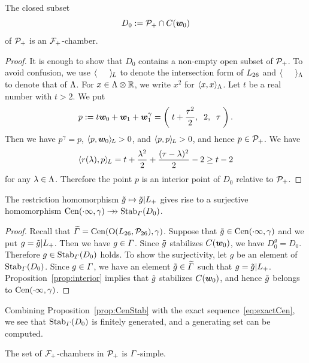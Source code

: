 \documentclass{amsart} %
\begin{document}
%
%
\begin{proposition}\label{prop:D0}
The closed subset 
\[
D_0:=\mathord{\mathcal{P}}_{+}\cap \mathord{C}(\boldsymbol{w}_0)
\]
of $\mathord{\mathcal{P}}_{+}$ is an $\mathord{\mathcal{F}}_{+}$-chamber.
\end{proposition}
%
\begin{proof}
It is enough to show that $D_0$ contains a non-empty open subset of $\mathord{\mathcal{P}}_{+}$.
To avoid confusion, we use $\langle \phantom{a, a} \rangle_{\hskip -1pt L}$ to denote the intersection form of $L_{26}$
and $\langle \phantom{a, a} \rangle_{\Lambda}$ to denote that of $\Lambda$.
For $x\in \Lambda\otimes\mathord{\mathbb{R}}$, we write $x^2$ for $\langle x,x \rangle_{\Lambda}$.
Let $t$ be a real number with $t>2$.
We put
\[
p:=t\boldsymbol{w}_0+\boldsymbol{w}_1+\boldsymbol{w}_1^{\gamma}=\left(\; t+\frac{\tau^2}{2}, \;\;2, \;\; \tau\;\right).
\]
%
Then we have $p^{\gamma}=p$, $\langle p, \boldsymbol{w}_0 \rangle_{\hskip -1pt L}>0$, and $\langle p, p \rangle_{\hskip -1pt L}>0$,
and hence $p\in \mathord{\mathcal{P}}_{+}$.
We have 
\[
\langle r(\lambda), p \rangle_{\hskip -1pt L}=t+\frac{\lambda^2}{2}+\frac{(\tau-\lambda)^2}{2}-2\ge t-2
\]
for any $\lambda\in \Lambda$.
Therefore the point $p$ is an interior point of $D_0$ relative to $\mathord{\mathcal{P}}_{+}$.
\end{proof}
%
\begin{proposition}\label{prop:CenStab}
The restriction homomorphism
$\tilde{g}\mapsto \tilde{g}|L_{+}$
gives rise to a surjective homomorphism 
$\mathrm{Cen}(\cdot \infty, \gamma)\mathrel{\rightarrow\!\!\!\!\rightarrow} \operatorname{Stab}_{\varGamma}(D_0)$.
\end{proposition}
%
\begin{proof}
Recall that 
$\widetilde{\varGamma}=\mathrm{Cen}(\mathord{\mathrm{O}}(L_{26}, \mathord{\mathcal{P}}_{26}), \gamma)$.
Suppose that $\tilde{g}\in \mathrm{Cen}(\cdot \infty, \gamma)$
and we put $g=\tilde{g}|L_{+}$.
Then we have $g\in \varGamma$.
Since $\tilde{g}$ stabilizes $\mathord{C}(\boldsymbol{w}_0)$,
we have $D_0^g=D_0$.
Therefore $ g\in \operatorname{Stab}_{\varGamma}(D_0)$ holds.
To show the surjectivity,
let $g$ be an element of $\operatorname{Stab}_{\varGamma}(D_0)$.
Since $g\in \varGamma$,
we have an element $\tilde{g}\in \widetilde{\varGamma}$ such that $g=\tilde{g}|L_{+}$.
Proposition~\ref{prop:interior} implies that $\tilde{g}$ stabilizes $\mathord{C}(\boldsymbol{w}_0)$,
and hence $\tilde{g}$ belongs to $\mathrm{Cen}(\cdot \infty, \gamma)$.
\end{proof}
%
%
Combining Proposition~\ref{prop:CenStab} with the exact sequence~\eqref{eq:exactCen}, we see that 
$\operatorname{Stab}_{\varGamma}(D_0)$ is finitely generated,
and a generating set can be computed.
%
\begin{proposition}\label{prop:PhiSimple}
The set of $\mathord{\mathcal{F}}_{+}$-chambers in $\mathord{\mathcal{P}}_{+}$ is $\varGamma$-simple.
\end{proposition}
%
\end{document}
